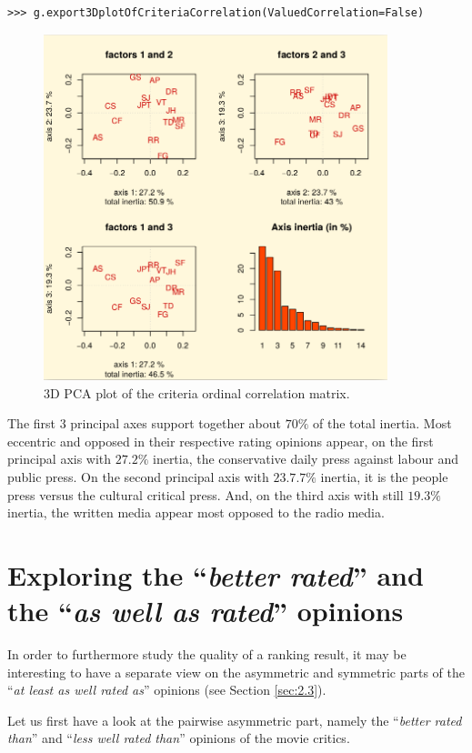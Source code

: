 \begin{lstlisting}
>>> g.export3DplotOfCriteriaCorrelation(ValuedCorrelation=False)
\end{lstlisting}
\begin{figure}[h]
\includegraphics[width=10cm]{Figures/correlationPCA.png}
\caption{3D PCA plot of the criteria ordinal correlation matrix.}
\label{fig:16.7}       %
\end{figure}
The first 3 principal axes support together about $70\%$ of the total inertia. Most eccentric and opposed in their respective rating opinions appear, on the first principal axis with $27.2\%$ inertia, the conservative daily press against labour and public press. On the second principal axis with $23.7.7\%$ inertia, it is the people press versus the cultural critical press. And, on the third axis with still $19.3\%$ inertia, the written media appear most opposed to the radio media.

\section{Exploring the ``\emph{better rated}''  and the ``\emph{as well as rated}'' opinions}
\label{sec:16.5}

In order to furthermore study the quality of a ranking result, it may be interesting to have a separate view on the asymmetric and symmetric parts of the ``\emph{at least as well rated as}'' opinions (see Section \ref{sec:2.3}).

Let us first have a look at the pairwise asymmetric part, namely the ``\emph{better rated than}'' and ``\emph{less well rated than}'' opinions of the movie critics. 

